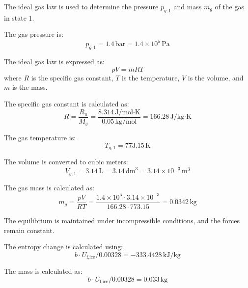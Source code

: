 The ideal gas law is used to determine the pressure \( p_{g,1} \) and mass \( m_g \) of the gas in state 1.  

The gas pressure is:  
\[
p_{g,1} = 1.4 \, \text{bar} = 1.4 \times 10^5 \, \text{Pa}
\]  

The ideal gas law is expressed as:  
\[
p V = m R T
\]  
where \( R \) is the specific gas constant, \( T \) is the temperature, \( V \) is the volume, and \( m \) is the mass.  

The specific gas constant is calculated as:  
\[
R = \frac{R_u}{M_g} = \frac{8.314 \, \text{J/mol·K}}{0.05 \, \text{kg/mol}} = 166.28 \, \text{J/kg·K}
\]  

The gas temperature is:  
\[
T_{g,1} = 773.15 \, \text{K}
\]  

The volume is converted to cubic meters:  
\[
V_{g,1} = 3.14 \, \text{L} = 3.14 \, \text{dm}^3 = 3.14 \times 10^{-3} \, \text{m}^3
\]  

The gas mass is calculated as:  
\[
m_g = \frac{p V}{R T} = \frac{1.4 \times 10^5 \cdot 3.14 \times 10^{-3}}{166.28 \cdot 773.15} = 0.0342 \, \text{kg}
\]

The equilibrium is maintained under incompressible conditions, and the forces remain constant.

The entropy change is calculated using:  
\[
b \cdot U_{\text{f,ice}} / 0.00328 = -333.4428 \, \text{kJ/kg}
\]  

The mass is calculated as:  
\[
b \cdot U_{\text{f,ice}} / 0.00328 = 0.033 \, \text{kg}
\]